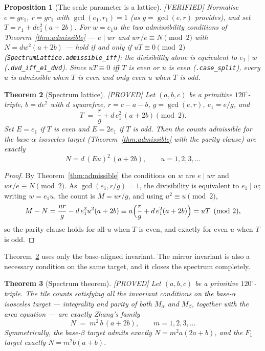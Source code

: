 \documentclass[11pt,reqno]{amsart}
\theoremstyle{plain}
\newtheorem{theorem}{Theorem}
\newtheorem{proposition}[theorem]{Proposition}
\theoremstyle{definition}
\newcommand{\lab}[1]{\hfill\textnormal{\footnotesize\textsc{[#1]}}}
\begin{document}
\begin{proposition}[The scale parameter is a lattice]\label{prop:latticeparam}\lab{VERIFIED}
Normalise $e=g e_1$, $r=g r_1$ with $\gcd(e_1,r_1)=1$ (as $g=\gcd(e,r)$ provides), and set
$T=r_1+d e_1^2(a+2b)$. For $w=e_1u$ the two admissibility conditions of
Theorem~\ref{thm:admissible} --- $e\mid w r$ and $wr/e\equiv N\pmod 2$ with $N=dw^2(a+2b)$ ---
hold if and only if $uT\equiv0\pmod2$ (\texttt{SpectrumLattice.admissible\_iff}); the divisibility
alone is equivalent to $e_1\mid w$ (\texttt{.dvd\_iff\_e1\_dvd}). Since $u T\equiv0$ iff $T$ is even
or $u$ is even (\texttt{.case\_split}), every $u$ is admissible when $T$ is even and only even $u$
when $T$ is odd.
\end{proposition}

\begin{theorem}[Spectrum lattice]\label{thm:lattice}\lab{PROVED}
Let $(a,b,c)$ be a primitive $120^\circ$-triple, $b=de^2$ with $d$ squarefree, $r=c-a-b$,
$g=\gcd(e,r)$, $e_1=e/g$, and
\[
T \;=\; \frac rg + d\,e_1^2\,(a+2b) \pmod 2 .
\]
Set $E=e_1$ if $T$ is even and $E=2e_1$ if $T$ is odd. Then the counts admissible for the
base-$\alpha$ isosceles target (Theorem~\ref{thm:admissible} with the parity clause) are exactly
\[
N=d\,(Eu)^2\,(a+2b),\qquad u=1,2,3,\dots
\]
\end{theorem}

\begin{proof}
By Theorem~\ref{thm:admissible} the conditions on $w$ are $e\mid wr$ and
$wr/e\equiv N\pmod2$. As $\gcd(e_1,r/g)=1$, the divisibility is equivalent to $e_1\mid w$; writing $w=e_1u$, the
count is $M=ur/g$, and using $u^2\equiv u\pmod 2$,
\[
M-N=\frac{ur}{g}-d\,e_1^2u^2(a+2b)\equiv u\Bigl(\frac rg+d\,e_1^2(a+2b)\Bigr)=uT\pmod2,
\]
so the parity clause holds for all $u$ when $T$ is even, and exactly for even $u$ when $T$ is odd.
\end{proof}

Theorem~\ref{thm:lattice} uses only the base-aligned invariant. The mirror invariant is also a
necessary condition on the same target, and it closes the spectrum completely.

\begin{theorem}[Spectrum theorem]\label{thm:spectrum}\lab{PROVED}
Let $(a,b,c)$ be a primitive $120^\circ$-triple. The tile counts satisfying \emph{all} the
invariant conditions on the base-$\alpha$ isosceles target --- integrality and parity of both
$M_\alpha$ and $M_\beta$, together with the area equation --- are exactly Zhang's family
\[
N \;=\; m^2\, b\,(a+2b),\qquad m=1,2,3,\dots
\]
Symmetrically, the base-$\beta$ target admits exactly $N=m^2a(2a+b)$, and the $F_1$ target
exactly $N=m^2b(a+b)$.
\end{theorem}
\end{document}
